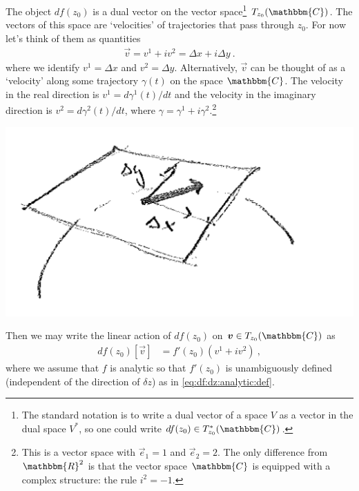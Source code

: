 \documentclass[
  11pt,
	colorful,
	raggedright,
]{tufte-style-thesis-flip}
\begin{document}
The object $df(z_0)$ is a dual vector on the vector space\footnote{The standard notation is to write a dual vector of a space $V$ as a vector in the dual space $V^*$, so one could write $df(z_0) \in T^*_{z_0}(\mathbbm{C})$.} $T_{z_0}(\mathbbm{C})$.  The vectors of this space are `velocities' of trajectories that pass through $z_0$. For now let's think of them as quantities
\begin{align}
  \vec v = v^1 + i v^2 = \Delta x + i \Delta y \ .
\end{align}
where we identify $v^1 = \Delta x$ and $v^2 = \Delta y$. Alternatively, $\vec{v}$ can be thought of as a `velocity' along some trajectory $\gamma(t)$ on the space $\mathbbm{C}$. The velocity in the real direction is $v^1 = d\gamma^1(t)/dt$ and the velocity in the imaginary direction is $v^2 = d\gamma^2(t)/dt$, where $\gamma = \gamma^1 + i \gamma^2$.\footnote{This is a vector space with $\vec{e}_{1} = 1$ and  $\vec{e}_{2} = 2$. The only difference from $\mathbbm{R}^2$ is that the vector space $\mathbbm{C}$ is equipped with a complex structure: the rule $i^2 = -1$.}

\begin{center}
\includegraphics[width=.5\textwidth]{figures/lec13_tanvec.png}
\end{center}
Then we may write the linear action of $df(z_0)$ on $\vec v \in T_{z_0}(\mathbbm{C})$ as
\begin{align}
  df(z_0)\left[\vec{v}\right] &=
  f'(z_0)\left(v^1 + i v^2\right)
  \ ,
  \label{eq:diff:geo:CR:1}
\end{align}
where we assume that $f$ is analytic so that $f'(z_0)$ is unambiguously defined (independent of the direction of $\delta z$) as in \eqref{eq:df:dz:analytic:def}. 
\end{document}
